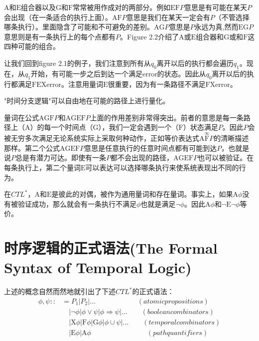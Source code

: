 \documentclass{book}
\begin{document}
    $\mathrm{A}$和$\mathrm{E}$组合器以及$\mathrm{G}$和$\mathrm{F}$常常被用作成对的两部分。例如$\mathrm{E}\mathrm{F}P$意思是有可能在某天$P$会出现（在一条适合的执行上面）。$\mathrm{A}\mathrm{F}P$意思是我们在某天一定会有$P$（不管选择哪条执行）。里面隐含了可能和不可避免的差别。$\mathrm{A}\mathrm{G}P$意思是$P$永远为真,然而$\mathrm{E}\mathrm{G}P$意思则是有一条执行上的每个点都有$P$。Figure 2.2介绍了$\mathrm{A}$或$\mathrm{E}$组合器和$\mathrm{G}$或和$\mathrm{F}$这四种可能的组合。

    让我们回到figure 2.1的例子，我们注意到所有从$q_0$离开以后的执行都会遍历$q_1$。现在，从$q_1$开始，有可能一步之后到达一个满足error的状态。因此从$q_0$离开以后的执行都满足$\mathrm{F}\mathrm{E}\mathrm{X}\text{error}$。注意用量词$\mathrm{E}$很重要，因为有一条路径不满足$\mathrm{F}\mathrm{X} \text{error}$。

    "时间分支逻辑"可以自由地在可能的路径上进行量化。

    量词在公式$\mathrm{A}\mathrm{G}\mathrm{F}P$和$\mathrm{A}\mathrm{G}\mathrm{E}\mathrm{F}P$上面的作用差别非常得突出。前者的意思是每一条路径上（$\mathrm{A}$）的每一个时间点（$\mathrm{G}$），我们一定会遇到一个（$\mathrm{F}$）状态满足$P$。因此$P$会被无穷多次满足无论系统实际上采取何种动作，正如等价表达式$\mathrm{A}\overset{\infty}{\mathrm{F}}P$的清晰描述那样。第二个公式$\mathrm{A}\mathrm{G}\mathrm{E}\mathrm{F}P$意思是任意执行的任意时间点都有可能到达$P$，也就是说$P$总是有潜力可达。即使有一条$P$都不会出现的路径，$\mathrm{A}\mathrm{G}\mathrm{E}\mathrm{F}P$也可以被验证。在每条执行上，第二个量词$\mathrm{E}$可以表达可以选择哪条执行来使系统表现出不同的行为。

    在$CTL^*$，$\mathrm{A}$和$\mathrm{E}$是彼此的对偶，被作为通用量词和存在量词。事实上，如果$\mathrm{A}\phi$没有被验证成功，那么就会有一条执行不满足$\phi$也就是满足$\neg \phi$。因此$\mathrm{A}\phi$和$\neg \mathrm{E}\neg\phi$等价。



    \section{时序逻辑的正式语法(The Formal Syntax of Temporal Logic)}

    \quad 上述的概念自然而然地就引出了下述$CTL^*$的正式语法：
    \begin{equation*}
      \begin{split}
         \phi,\psi :: & = P_1|P_2|\dots   \qquad\qquad\qquad (atomic propositions)\\
           & \quad |\neg\phi|\phi \vee \psi|\phi \Rightarrow\psi|\dots \qquad (boolean combinators)\\
           & \quad |\mathrm{X}\phi|\mathrm{F}\phi|\mathrm{G}\phi|\phi \cup \psi|\dots \qquad(temporal combinators)\\
           & \quad |\mathrm{E}\phi|\mathrm{A}\phi \qquad\qquad\qquad\qquad (path quantifiers)
      \end{split}
    \end{equation*}
\end{document}
